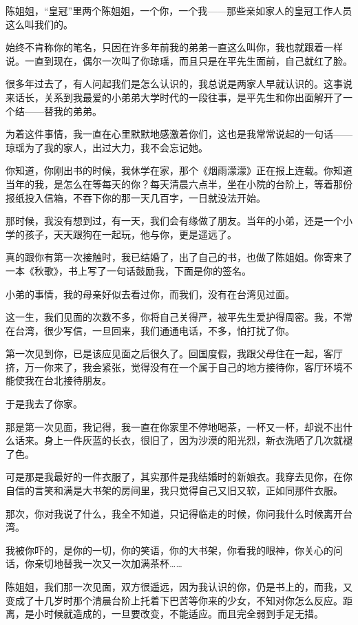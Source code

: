 \par 陈姐姐，“皇冠”里两个陈姐姐，一个你，一个我——那些亲如家人的皇冠工作人员这么叫我们的。
\par 始终不肯称你的笔名，只因在许多年前我的弟弟一直这么叫你，我也就跟着一样说。一直到现在，偶尔一次叫了你琼瑶，而且只是在平先生面前，自己就红了脸。
\par 很多年过去了，有人问起我们是怎么认识的，我总说是两家人早就认识的。这事说来话长，关系到我最爱的小弟弟大学时代的一段往事，是平先生和你出面解开了一个结——替我的弟弟。
\par 为着这件事情，我一直在心里默默地感激着你们，这也是我常常说起的一句话——琼瑶为了我的家人，出过大力，我不会忘记她。
\par 你知道，你刚出书的时候，我休学在家，那个《烟雨濛濛》正在报上连载。你知道当年的我，是怎么在等每天的你？每天清晨六点半，坐在小院的台阶上，等着那份报纸投入信箱，不吞下你的那一天几百字，一日就没法开始。
\par 那时候，我没有想到过，有一天，我们会有缘做了朋友。当年的小弟，还是一个小学的孩子，天天跟狗在一起玩，他与你，更是遥远了。
\par 真的跟你有第一次接触时，我已结婚了，出了自己的书，也做了陈姐姐。你寄来了一本《秋歌》，书上写了一句话鼓励我，下面是你的签名。
\par 小弟的事情，我的母亲好似去看过你，而我们，没有在台湾见过面。
\par 这一生，我们见面的次数不多，你将自己关得严，被平先生爱护得周密。我，不常在台湾，很少写信，一旦回来，我们通通电话，不多，怕打扰了你。
\par 第一次见到你，已是该应见面之后很久了。回国度假，我跟父母住在一起，客厅挤，万一你来了，我会紧张，觉得没有在一个属于自己的地方接待你，客厅环境不能使我在台北接待朋友。
\par 于是我去了你家。
\par 那是第一次见面，我记得，我一直在你家里不停地喝茶，一杯又一杯，却说不出什么话来。身上一件灰蓝的长衣，很旧了，因为沙漠的阳光烈，新衣洗晒了几次就褪了色。
\par 可是那是我最好的一件衣服了，其实那件是我结婚时的新娘衣。我穿去见你，在你自信的言笑和满是大书架的房间里，我只觉得自己又旧又软，正如同那件衣服。
\par 那次，你对我说了什么，我全不知道，只记得临走的时候，你问我什么时候离开台湾。
\par 我被你吓的，是你的一切，你的笑语，你的大书架，你看我的眼神，你关心的问话，你亲切地替我一次又一次加满茶杯……
\par 陈姐姐，我们那一次见面，双方很遥远，因为我认识的你，仍是书上的，而我，又变成了十几岁时那个清晨台阶上托着下巴苦等你来的少女，不知对你怎么反应。距离，是小时候就造成的，一旦要改变，不能适应。而且完全弱到手足无措。

